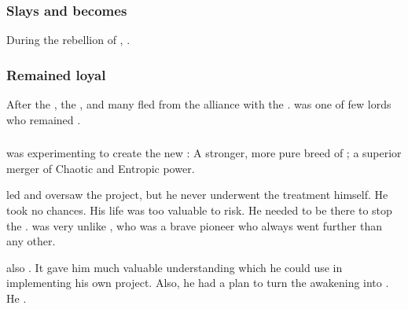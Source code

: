 




\subsubsection{Slays \Damiarch and becomes \Azraid}
During the rebellion of \Merkyrah, \Gepheral {}. 





\subsubsection{Remained loyal}
After the , the \resphain{} , and many fled from the alliance with the \banelords. 
\Azraid{} was one of few \resphan{} lords who remained . 





\subsubsection{\NeoResphain}
\Azraid{} was experimenting to create the new : 
A stronger, more pure breed of \resphan; a superior merger of Chaotic and Entropic power. 

\Azraid led and oversaw the \neoresphan project, but he never underwent the treatment himself. 
He took no chances. 
His life was too valuable to risk.
He needed to be there to stop the \banes.
\Azraid was very unlike \Sethicus, who was a brave pioneer who always went further than any other. 

\Azraid also .
It gave him much valuable understanding which he could use in implementing his own \neoresphan project. 
Also, he had a plan to turn the awakening \malachim into \neoresphain. 
He . 









